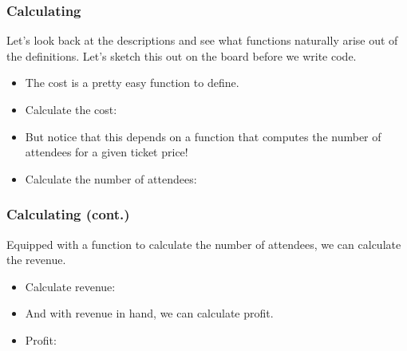 \documentclass{beamer}
\begin{document}
\begin{frame}
  \frametitle{Calculating}
  Let's look back at the descriptions and see what functions naturally arise
  out of the definitions. Let's sketch this out on the board before we write code.
  \begin{itemize}
  \item<2-> The cost is a pretty easy function to define.
  \item<3-> Calculate the cost: \cost
  \item<4-> But notice that this depends on a function that computes the number
    of attendees for a given ticket price!
  \item<5-> Calculate the number of attendees: \attendees    
  \end{itemize}
\end{frame}



\begin{frame}
  \frametitle{Calculating (cont.)}
  Equipped with a function to calculate the number of attendees,
  we can calculate the revenue.
  \begin{itemize}
  \item<2-> Calculate revenue: \revenue
  \item<3-> And with revenue in hand, we can calculate profit.
  \item<4-> Profit: \profit    
  \end{itemize}
\end{frame}

\end{document}
